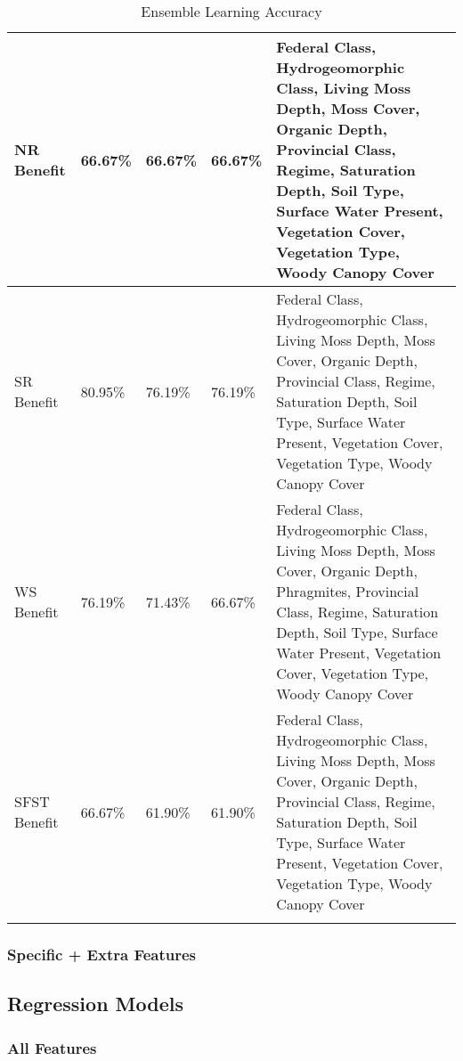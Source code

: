 \documentclass[12pt,letterpaper]{article}
\begin{document}
\begin{longtable}{|p{2cm}|p{2cm}|p{2cm}|p{2cm}|p{6cm}|}
NR Benefit & 66.67\% & 66.67\% & 66.67\% & Federal Class, Hydrogeomorphic Class, Living Moss Depth, Moss Cover, Organic Depth, Provincial Class, Regime, Saturation Depth, Soil Type, Surface Water Present, Vegetation Cover, Vegetation Type, Woody Canopy Cover \\ \hline
SR Benefit & 80.95\% & 76.19\% & 76.19\% & Federal Class, Hydrogeomorphic Class, Living Moss Depth, Moss Cover, Organic Depth, Provincial Class, Regime, Saturation Depth, Soil Type, Surface Water Present, Vegetation Cover, Vegetation Type, Woody Canopy Cover \\ \hline
WS Benefit & 76.19\% & 71.43\% & 66.67\% & Federal Class, Hydrogeomorphic Class, Living Moss Depth, Moss Cover, Organic Depth, Phragmites, Provincial Class, Regime, Saturation Depth, Soil Type, Surface Water Present, Vegetation Cover, Vegetation Type, Woody Canopy Cover \\ \hline
SFST Benefit & 66.67\% & 61.90\% & 61.90\% & Federal Class, Hydrogeomorphic Class, Living Moss Depth, Moss Cover, Organic Depth, Provincial Class, Regime, Saturation Depth, Soil Type, Surface Water Present, Vegetation Cover, Vegetation Type, Woody Canopy Cover \\ \hline
\caption{Ensemble Learning Accuracy}
\label{tab_class_xtra:ensemble_reduction}
\end{longtable}
\clearpage
\subsubsection{Specific + Extra Features}





\clearpage
\subsection{Regression Models}\label{sec:reg}
\subsubsection{All Features}


\clearpage

\clearpage

\clearpage

\clearpage

\clearpage

\clearpage

\clearpage

\clearpage

\clearpage
\end{document}
